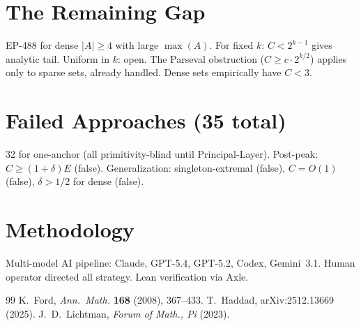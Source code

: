 \documentclass[11pt,a4paper]{article}
\theoremstyle{definition}
\begin{document}
\section{The Remaining Gap}

EP-488 for dense $|A| \geq 4$ with large $\max(A)$. For fixed $k$:
$C < 2^{k-1}$ gives analytic tail. Uniform in $k$: open. The Parseval
obstruction ($C \geq c \cdot 2^{k/2}$) applies only to sparse sets, already
handled. Dense sets empirically have $C < 3$.

\section{Failed Approaches (35 total)}

32 for one-anchor (all primitivity-blind until Principal-Layer).
Post-peak: $C \geq (1{+}\delta)E$ (false). Generalization:
singleton-extremal (false), $C = O(1)$ (false), $\delta > 1/2$ for
dense (false).

\section{Methodology}

Multi-model AI pipeline: Claude, GPT-5.4, GPT-5.2, Codex, Gemini~3.1.
Human operator directed all strategy. Lean verification via Axle.

\begin{thebibliography}{99}
 K.~Ford, \emph{Ann.\ Math.} \textbf{168} (2008), 367--433.
 T.~Haddad, arXiv:2512.13669 (2025).
 J.~D.~Lichtman, \emph{Forum of Math., Pi} (2023).
\end{thebibliography}
\end{document}
